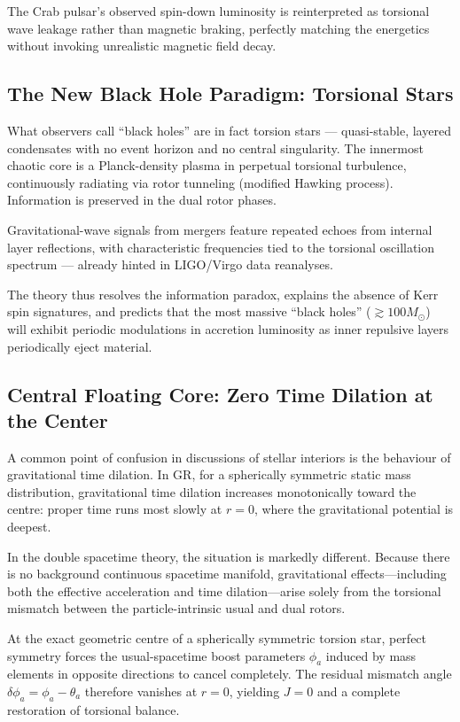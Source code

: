 \documentclass[dvipdfmx,a4paper]{article}
\begin{document}
The Crab pulsar's observed spin-down luminosity is reinterpreted as torsional wave leakage rather than magnetic braking, perfectly matching the energetics without invoking unrealistic magnetic field decay.

\subsection{The New Black Hole Paradigm: Torsional Stars}

What observers call ``black holes'' are in fact torsion stars — quasi-stable, layered condensates with no event horizon and no central singularity. The innermost chaotic core is a Planck-density plasma in perpetual torsional turbulence, continuously radiating via rotor tunneling (modified Hawking process). Information is preserved in the dual rotor phases.

Gravitational-wave signals from mergers feature repeated echoes from internal layer reflections, with characteristic frequencies tied to the torsional oscillation spectrum — already hinted in LIGO/Virgo data reanalyses.

The theory thus resolves the information paradox, explains the absence of Kerr spin signatures, and predicts that the most massive ``black holes'' ($\gtrsim 100 M_\odot$) will exhibit periodic modulations in accretion luminosity as inner repulsive layers periodically eject material.

\subsection{Central Floating Core: Zero Time Dilation at the Center}

A common point of confusion in discussions of stellar interiors is the behaviour of gravitational time dilation. In GR, for a spherically symmetric static mass distribution, gravitational time dilation increases monotonically toward the centre: proper time runs most slowly at \(r=0\), where the gravitational potential is deepest.

In the double spacetime theory, the situation is markedly different. Because there is no background continuous spacetime manifold, gravitational effects—including both the effective acceleration and time dilation—arise solely from the torsional mismatch between the particle-intrinsic usual and dual rotors.

At the exact geometric centre of a spherically symmetric torsion star, perfect symmetry forces the usual-spacetime boost parameters \(\phi_a\) induced by mass elements in opposite directions to cancel completely. The residual mismatch angle \(\delta\phi_a = \phi_a - \theta_a\) therefore vanishes at \(r=0\), yielding \(J=0\) and a complete restoration of torsional balance.
\end{document}
